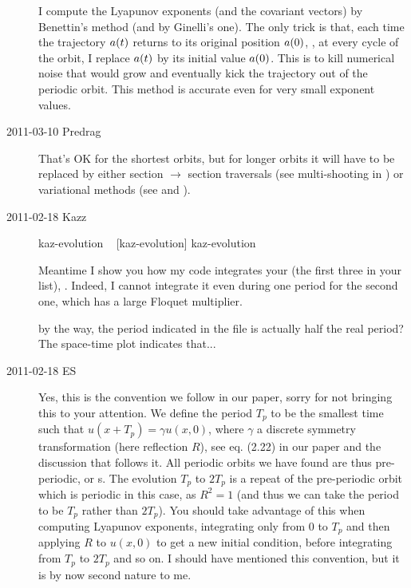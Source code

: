 \begin{description}
I compute the Lyapunov exponents (and the covariant vectors)
by Benettin's method (and by Ginelli's one). The only trick is that, each time
the trajectory $\ssp(t)$ returns to its original position $\ssp(0)$, \ie, at every cycle
of the orbit, I replace $\ssp(t)$ by its initial value $\ssp(0)$. This is to kill
numerical noise that would grow and eventually kick the trajectory
out of the periodic orbit. This method is accurate even for very small
exponent values.

\renewcommand{\ssp}{a}

\item[2011-03-10 Predrag] That's OK for the shortest orbits, but
for longer orbits it will have to be replaced by either section $\to$
section traversals (see multi-shooting in
) or variational methods (see
 and
).

\item[2011-02-18 Kazz]

{kaz-evolution}   %
{}   %
{    %
\po\  [kaz-evolution]
}
{kaz-evolution}   %


Meantime I show you how my code integrates your {\po} (the first three in your
list), . Indeed, I cannot integrate
it even during one period for the second one, which has a large
Floquet multiplier.

by the way, the period indicated in the file is actually half the real period?
The space-time plot indicates that...

\item[2011-02-18 ES]

Yes, this is the convention we follow in our paper, sorry for not
bringing this to your attention. We define the period $T_p$ to be the
smallest time such that $u(x+T_p)=\gamma u(x,0)$, where $\gamma$ a
discrete symmetry transformation (here reflection $R$), see eq. (2.22) in
our paper and the discussion that follows it. All periodic orbits we
have found are thus pre-periodic, or \rpo s.
The evolution
$T_p$ to $2T_p$ is a repeat of the pre-periodic orbit which
is periodic in this case, as $R^2=1$ (and thus we can take the period to be $T_p$
rather than $2T_p$). You should take advantage of this
when computing Lyapunov exponents, integrating only from $0$ to $T_p$ and
then applying $R$ to $u(x,0)$ to get a new initial condition, before
integrating from $T_p$ to $2T_p$ and so on. I should have mentioned this
convention, but it is by now second nature to me.


\end{description}
